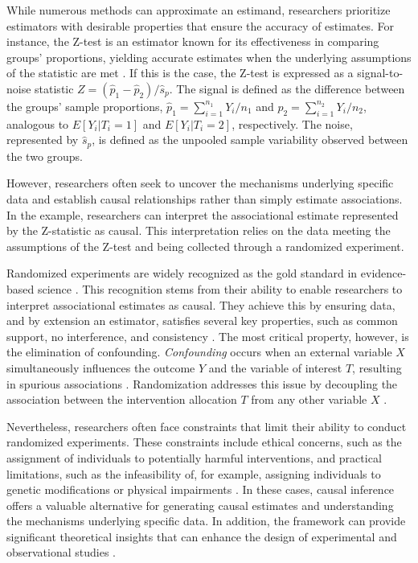 \documentclass[
  authoryear,
  review,
  1p]{elsarticle}
\begin{document}
While numerous methods can approximate an estimand, researchers
prioritize estimators with desirable properties that ensure the accuracy
of estimates. For instance, the Z-test is an estimator known for its
effectiveness in comparing groups' proportions, yielding accurate
estimates when the underlying assumptions of the statistic are met
\citep{Kanji_2006}. If this is the case, the Z-test is expressed as a
signal-to-noise statistic
\(Z = (\hat{p}_{1} - \hat{p}_{2})/ \hat{s}_{p}\). The signal is defined
as the difference between the groups' sample proportions,
\(\hat{p}_{1} = \sum_{i=1}^{n_{1}}{Y_{i}/n_{1}}\) and
\(\hat{p}_{2} = \sum_{i=1}^{n_{2}}{Y_{i}/n_{2}}\), analogous to
\(E[Y_{i}| T_{i}=1]\) and \(E[Y_{i}| T_{i}=2]\), respectively. The
noise, represented by \(\hat{s}_{p}\), is defined as the unpooled sample
variability observed between the two groups.

However, researchers often seek to uncover the mechanisms underlying
specific data and establish causal relationships rather than simply
estimate associations. In the example, researchers can interpret the
associational estimate represented by the Z-statistic as causal. This
interpretation relies on the data meeting the assumptions of the Z-test
and being collected through a randomized experiment.

Randomized experiments are widely recognized as the gold standard in
evidence-based science \citep{Hariton_et_al_2018, Hansson_2014}. This
recognition stems from their ability to enable researchers to interpret
associational estimates as causal. They achieve this by ensuring data,
and by extension an estimator, satisfies several key properties, such as
common support, no interference, and consistency
\citep{Morgan_et_al_2014, Neal_2020}. The most critical property,
however, is the elimination of confounding. \emph{Confounding} occurs
when an external variable \(X\) simultaneously influences the outcome
\(Y\) and the variable of interest \(T\), resulting in spurious
associations \citep{Everitt_et_al_2010}. Randomization addresses this
issue by decoupling the association between the intervention allocation
\(T\) from any other variable \(X\)
\citep{Morgan_et_al_2014, Neal_2020}.

Nevertheless, researchers often face constraints that limit their
ability to conduct randomized experiments. These constraints include
ethical concerns, such as the assignment of individuals to potentially
harmful interventions, and practical limitations, such as the
infeasibility of, for example, assigning individuals to genetic
modifications or physical impairments \citep{Neal_2020}. In these cases,
causal inference offers a valuable alternative for generating causal
estimates and understanding the mechanisms underlying specific data. In
addition, the framework can provide significant theoretical insights
that can enhance the design of experimental and observational studies
\citep{McElreath_2020}.
\end{document}
